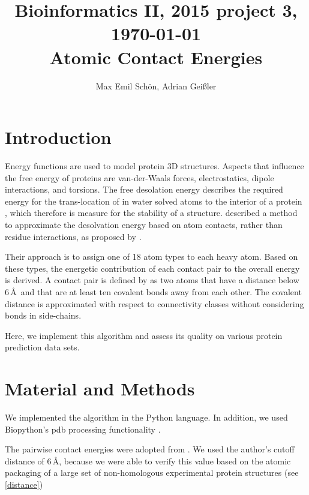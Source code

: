 \documentclass[11pt,a4paper]{article}
\begin{document}
\title{
  {\small Bioinformatics II, 2015 \hfill project 3, \today}\\
   Atomic Contact Energies
}

\author{
    Max Emil Sch{\"o}n, Adrian Gei{\ss}ler
}

\maketitle




\section{Introduction}
Energy functions are used to model protein 3D structures. Aspects that influence
the free energy of proteins are van-der-Waals forces, electrostatics, dipole
interactions, and torsions.
The free desolation energy describes the required energy for the trans-location
of in water solved atoms to the interior of a protein \citep{Zhang1997}, which
therefore is measure for the stability of a structure.
\citet{Zhang1997} described a method to approximate
the desolvation energy based on atom contacts, rather than residue interactions, as proposed by \citet{Miyazawa1996}.

Their approach is to assign one of 18 atom types to each heavy atom. Based on these types, the energetic contribution of each contact pair to the overall energy is derived. A contact pair is defined by \citet{Zhang1997} as two atoms that have a distance below 6\,\AA\ and that are at least ten covalent bonds away from each other. The covalent distance is approximated with respect to connectivity classes without considering bonds in side-chains.

Here, we implement this algorithm and assess its quality on various protein prediction data sets.

\section{Material and Methods}
We implemented the algorithm in the Python language. In addition, we used Biopython's pdb processing functionality \citep{pdb}.

The pairwise contact energies were adopted from \citet{Zhang1997}. We used the
author's cutoff distance of 6\,\AA, because we were able to verify this value
based on the atomic packaging of a large set of non-homologous experimental
protein structures (see \autoref{distance})
\end{document}
